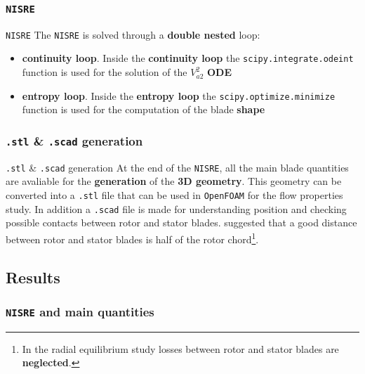 \subsubsection{\texttt{NISRE}}
	\begin{frame}[fragile]{\texttt{NISRE}}
		The \texttt{NISRE} is solved through a \textbf{double nested} loop:
		\begin{itemize}
			\item \textbf{continuity loop}. Inside the \textbf{continuity loop} the \verb|scipy.integrate.odeint| function is used for the solution of the $V_{a2}^2$ \textbf{ODE}
			\item \textbf{entropy loop}. Inside the \textbf{entropy loop} the \verb|scipy.optimize.minimize| function is used for the computation of the blade \textbf{shape}
		\end{itemize}
	\end{frame}

\subsubsection{\texttt{.stl} \& \texttt{.scad} generation}
	\begin{frame}[fragile]{\texttt{.stl} \& \texttt{.scad} generation}
		At the end of the \verb|NISRE|, all the main blade quantities are avaliable for the \textbf{generation} of the \textbf{3D geometry}. This geometry can be converted into a \verb|.stl| file that can be used in \verb|OpenFOAM| for the flow properties study. In addition a \verb|.scad| file is made for understanding position and checking possible contacts between rotor and stator blades.	
		\newline
		\newline 
		\cite{baskharone2006principles} suggested that a good distance between rotor and stator blades is half of the rotor chord\footnote{In the radial equilibrium study losses between rotor \newline and stator blades are \textbf{neglected}.}.
	\end{frame}

\subsection{Results}
	\subsubsection{\texttt{NISRE} and main quantities}

